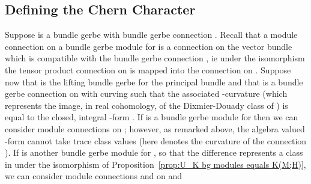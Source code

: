 \documentclass[a4paper,reqno]{amsart}
\theoremstyle{plain}
\theoremstyle{definition}
\theoremstyle{remark}
\numberwithin{equation}{section}
\numberwithin{figure}{section}
\providecommand{\<}{\langle}
\renewcommand{\>}{\rangle}
\begin{document}
\subsection{Defining the Chern Character} 

Suppose \coordHE{} is a bundle gerbe with 
bundle gerbe connection \coordHE{}.  
Recall that a module connection \coordHE{} 
on a bundle gerbe module \coordHE{} for \coordHE{} is a connection on 
the vector bundle \coordHE{} which is compatible with the 
bundle gerbe connection \coordHE{}, ie under the 
isomorphism \coordHE{} 
the tensor product connection \coordHE{} on \coordHE{} is mapped into 
the connection \coordHE{} on \coordHE{}.  
Suppose now that \coordHE{} is the lifting bundle 
gerbe for the principal \coordHE{} bundle 
\coordHE{} and that \coordHE{} is a bundle gerbe 
connection on \coordHE{} with curving \coordHE{} such that the 
associated \coordHE{}-curvature (which represents the image, in 
real cohomology, of the Dixmier-Douady class of \coordHE{}) is 
equal to the closed, integral \coordHE{}-form \coordHE{}.  If \coordHE{} is a 
\coordHE{} bundle gerbe module for \coordHE{} then we can consider 
module connections \coordHE{} on \coordHE{}; however, as remarked 
above, the algebra valued \coordHE{}-form \coordHE{} cannot take 
trace class values (here \coordHE{} denotes the curvature 
of the connection \coordHE{}).  If \coordHE{} is another 
\coordHE{} bundle gerbe module for \coordHE{}, so that the difference 
\coordHE{} represents a class in \coordHE{} 
under the isomorphism of Proposition~\ref{prop:U_K 
bg modules equals K(M;H)}, we can consider  
module connections \coordHE{} and \coordHE{} on \coordHE{} and 
\end{document}
